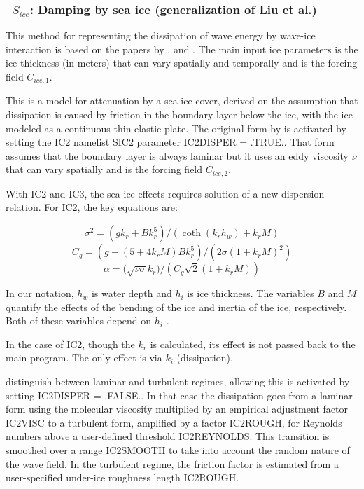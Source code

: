 \vsssub
\subsubsection{~$S_{ice}$: Damping by sea ice (generalization of Liu et al.)} \label{sec:ICE2}
\vsssub


\noindent
This method for representing the dissipation of wave energy by wave-ice interaction is based on the papers
by \cite{art:LMC88}, \cite{art:LHV91} and \cite{art:Aea15}. The main input ice parameters
is the ice thickness (in meters) that can vary spatially and temporally and is the forcing field  ${C_{ice,1}}$. 

This is a model for attenuation by a
sea ice cover, derived on the assumption that dissipation is caused by
friction in the boundary layer below the ice,
with the ice modeled as a continuous thin elastic plate. The original form by  \cite{art:LMC88} is activated by 
setting the {\code IC2} namelist SIC2 parameter {\code IC2DISPER = .TRUE.}. That form 
 assumes that the boundary layer is always laminar but it uses an eddy viscosity ${\nu}$ that can vary spatially 
and is the forcing field ${C_{ice,2}}$. 

With {\code IC2} and {\code IC3}, the sea ice effects requires solution of a
new dispersion relation. For {\code IC2}, the key equations are:

\begin{equation}\label{eq:ice1}
  {\sigma}^2 = ({gk_r} + {Bk_r^5})/(\coth({k_r}{h_w}) + {k_r}{M})
\end{equation}
\begin{equation}\label{eq:ice2}
  {C_g} = (g + (5 + 4{k_r}{M}){B}{k_r^5})/(2{\sigma}(1+{k_r}{M})^2)
\end{equation}
\begin{equation}\label{eq:ice3}
  {\alpha} = (\sqrt{{\nu\sigma}}{k_r)}/({C_g}\sqrt{2}(1+{k_r}{M}))
\end{equation}

\noindent
In our notation, $h_w$ is water depth and $h_i$ is ice thickness.  The
variables $B$ and $M$ quantify the effects of the bending of the ice and
inertia of the ice, respectively. Both of these variables depend on $h_i$ 
\citep[see][]{art:LMC88, art:LHV91}.

\vspace{\baselineskip} \noindent
In the case of {\code IC2}, though the ${k_r}$ is calculated, its effect is
not passed back to the main program. The only effect is via ${k_i}$
(dissipation).


 \cite{art:Aea15} distinguish between laminar and 
turbulent regimes, allowing this is activated by setting  {\code IC2DISPER = .FALSE.}. 
In that case the dissipation goes from a laminar form using the molecular viscosity multiplied by an 
empirical adjustment factor {\code IC2VISC} to a turbulent form, amplified by a factor {\code IC2ROUGH}, for Reynolds numbers 
above a user-defined threshold {\code IC2REYNOLDS}. This transition is smoothed over a range {\code IC2SMOOTH} to take into 
account the random nature of the wave field. In the turbulent regime, the friction factor 
is estimated from a user-specified under-ice roughness length {\code IC2ROUGH}. 
